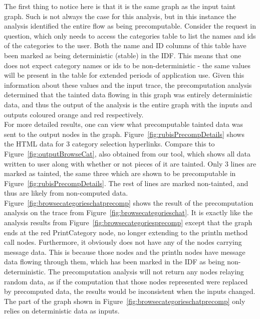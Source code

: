 \documentclass[msc,oneside]{ubcthesis}
\begin{document}
The first thing to notice here is that it is the same graph as the input taint graph. Such is not always the case for this analysis, but in this instance the analysis identified the entire flow as being precomputable. Consider the request in question, which only needs to access the categories table to list the names and ids of the categories to the user. Both the name and ID columns of this table have been marked as being deterministic (stable) in the IDF. This means that one does not expect category names or ids to be non-deterministic - the same values will be present in the table for extended periods of application use. Given this information about these values and the input trace, the precomputation analysis determined that the tainted data flowing in this graph was entirely deterministic data, and thus the output of the analysis is the entire graph with the inputs and outputs coloured orange and red respectively.\\

For more detailed results, one can view what precomputable tainted data was sent to the output nodes in the graph. Figure~\ref{fig:rubisPrecompDetails} shows the HTML data for 3 category selection hyperlinks. Compare this to Figure~\ref{fig:outputBrowseCat}, also obtained from our tool, which shows all data written to user along with whether or not pieces of it are tainted. Only 3 lines are marked as tainted, the same three which are shown to be precomputable in Figure~\ref{fig:rubisPrecompDetails}. The rest of lines are marked non-tainted, and thus are likely from non-computed data. \\

Figure~\ref{fig:browsecategorieschatprecomp} shows the result of the precomputation analysis on the trace from Figure~\ref{fig:browsecategorieschat}. It is exactly like the analysis results from Figure~\ref{fig:browsecategoriesprecomp} except that the graph ends at the red PrintCategory node, no longer extending to the println method call nodes. Furthermore, it obviously does not have any of the nodes carrying message data. This is because those nodes and the println nodes have message data flowing through them, which has been marked in the IDF as being non-deterministic. The precomputation analysis will not return any nodes relaying random data, as if the computation that those nodes represented were replaced by precomputed data, the results would be inconsistent when the inputs changed. The part of the graph shown in Figure~\ref{fig:browsecategorieschatprecomp} only relies on deterministic data as inputs.\\
\end{document}
